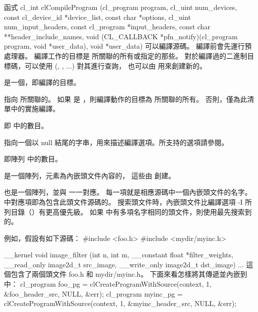 函式
\startclc
cl_int clCompileProgram (cl_program program,
			cl_uint num_devices,
			const cl_device_id *device_list,
			const char *options,
			cl_uint num_input_headers,
			const cl_program *input_headers,
			const char **header_include_names,
			void (CL_CALLBACK *pfn_notify)(cl_program program,
					void *user_data),
			void *user_data)
\stopclc
可以編譯源碼。
編譯前會先運行預處理器。
編譯工作的目標是  所關聯的所有或指定的那些。
對於編譯過的二進制目標碼，可以使用 (, , ...) 對其進行查詢，
也可以由  用來創建新的。

 是一個，即編譯的目標。

 指向  所關聯的。
如果  是 ，則編譯動作的目標為  所關聯的所有。
否則，僅為此清單中的實施編譯。

 即  中的數目。

 指向一個以 null 結尾的字串，用來描述編譯選項。所支持的選項請參閱。

 即陣列  中的數目。

 是一個陣列，元素為內嵌頭文件內容的，
這些由  創建。

 也是一個陣列，並與  一一對應。
每一項就是相應源碼中一個內嵌頭文件的名字。
  中對應項即為包含此頭文件源碼的。
搜索頭文件時，內嵌頭文件比編譯選項 -I 所列目錄（）有更高優先級。
如果  中有多項名字相同的頭文件，則使用最先搜索到的。

例如，假設有如下源碼：
\startclc
#include <foo.h>
#include <mydir/myinc.h>

__kernel void image_filter (int n, int m,
			__constant float *filter_weights,
			__read_only image2d_t src_image,
			__write_only image2d_t dst_image)
{
	...
}
\stopclc
這個包含了兩個頭文件 foo.h 和 mydir/myinc.h。
下面來看怎樣將其傳遞並內嵌到中：
\startclc
cl_program foo_pg = clCreateProgramWithSource(context,
				1, &foo_header_src, NULL, &err);
cl_program myinc_pg = clCreateProgramWithSource(context,
				1, &myinc_header_src, NULL, &err);

